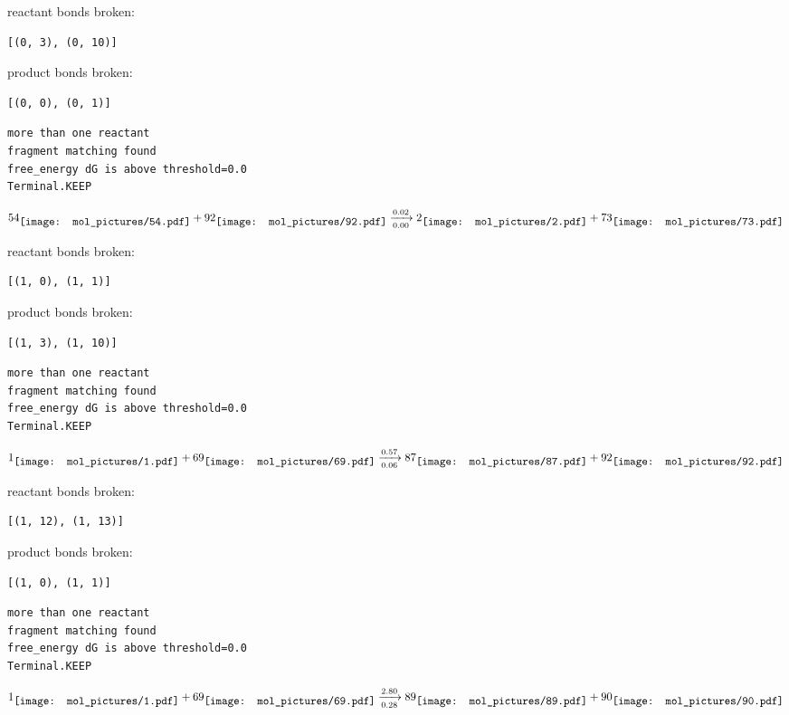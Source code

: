 \documentclass{article}
\begin{document}
reactant bonds broken:\begin{verbatim}
[(0, 3), (0, 10)]
\end{verbatim}
product bonds broken:\begin{verbatim}
[(0, 0), (0, 1)]
\end{verbatim}




\vspace{1cm}
\begin{verbatim}
more than one reactant
fragment matching found
free_energy dG is above threshold=0.0
Terminal.KEEP
\end{verbatim}
$$
54
\raisebox{-.5\height}{\texttt{[image: mol\_pictures/54.pdf]}}
+
92
\raisebox{-.5\height}{\texttt{[image: mol\_pictures/92.pdf]}}
\xrightarrow[0.00]{0.02}
2
\raisebox{-.5\height}{\texttt{[image: mol\_pictures/2.pdf]}}
+
73
\raisebox{-.5\height}{\texttt{[image: mol\_pictures/73.pdf]}}
$$


reactant bonds broken:\begin{verbatim}
[(1, 0), (1, 1)]
\end{verbatim}
product bonds broken:\begin{verbatim}
[(1, 3), (1, 10)]
\end{verbatim}




\vspace{1cm}
\begin{verbatim}
more than one reactant
fragment matching found
free_energy dG is above threshold=0.0
Terminal.KEEP
\end{verbatim}
$$
1
\raisebox{-.5\height}{\texttt{[image: mol\_pictures/1.pdf]}}
+
69
\raisebox{-.5\height}{\texttt{[image: mol\_pictures/69.pdf]}}
\xrightarrow[0.06]{0.57}
87
\raisebox{-.5\height}{\texttt{[image: mol\_pictures/87.pdf]}}
+
92
\raisebox{-.5\height}{\texttt{[image: mol\_pictures/92.pdf]}}
$$


reactant bonds broken:\begin{verbatim}
[(1, 12), (1, 13)]
\end{verbatim}
product bonds broken:\begin{verbatim}
[(1, 0), (1, 1)]
\end{verbatim}




\vspace{1cm}
\begin{verbatim}
more than one reactant
fragment matching found
free_energy dG is above threshold=0.0
Terminal.KEEP
\end{verbatim}
$$
1
\raisebox{-.5\height}{\texttt{[image: mol\_pictures/1.pdf]}}
+
69
\raisebox{-.5\height}{\texttt{[image: mol\_pictures/69.pdf]}}
\xrightarrow[0.28]{2.80}
89
\raisebox{-.5\height}{\texttt{[image: mol\_pictures/89.pdf]}}
+
90
\raisebox{-.5\height}{\texttt{[image: mol\_pictures/90.pdf]}}
$$
\end{document}
